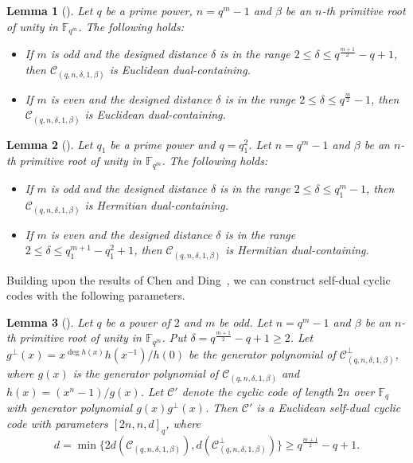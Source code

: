 \documentclass[journal,12pt,onecolumn]{IEEEtran}
\newtheorem{lemma}{Lemma}
\begin{document}
\begin{lemma}[\cite{4106108}]
    \label{Euclidean dual-containing}
    Let $q$ be a prime power, $n=q^m-1$ and $\beta$ be an $n$-th primitive root of unity in $\mathbb{F}_{q^m}$. The following holds:
    \begin{itemize}
        \item If $m$ is odd and the designed distance $\delta$ is in the range $2\le \delta\le q^{\frac{m+1}{2}}-q+1$, then $\mathcal{C}_{(q,n,\delta,1,\beta)}$ is Euclidean dual-containing.
        \item If $m$ is even and the designed distance $\delta$ is in the range $2\le \delta\le q^{\frac{m}{2}}-1$, then $\mathcal{C}_{(q,n,\delta,1,\beta)}$ is Euclidean dual-containing.
    \end{itemize}
\end{lemma}

\begin{lemma}[\cite{4106108}]
    \label{Hermitian dual-containing}
    Let $q_1$ be a prime power and $q=q_1^2$. Let $n=q^m-1$ and $\beta$ be an $n$-th primitive root of unity in $\mathbb{F}_{q^m}$. The following holds:
    \begin{itemize}
        \item If $m$ is odd and the designed distance $\delta$ is in the range $2\le \delta\le q_1^m-1$, then $\mathcal{C}_{(q,n,\delta,1,\beta)}$ is Hermitian dual-containing.
        \item If $m$ is even and the designed distance $\delta$ is in the range $2\le \delta\le q_1^{m+1}-q_1^2+1$, then $\mathcal{C}_{(q,n,\delta,1,\beta)}$ is Hermitian dual-containing.
    \end{itemize}
    
\end{lemma}

Building upon the results of Chen and Ding~\cite{10856234}, we can construct self-dual cyclic codes with the following parameters.

\begin{lemma}[\cite{10856234}]
\label{odd Euclidean self-dual}
    Let $q$ be a power of $2$ and $m$ be odd. Let $n=q^m-1$ and $\beta$ be an $n$-th primitive root of unity in $\mathbb{F}_{q^m}$. Put $\delta=q^{\frac{m+1}{2}}-q+1\ge2$. Let $g^\perp(x)=x^{\deg h(x)}h(x^{-1})/h(0)$ be the generator polynomial of $\mathcal{C}_{(q,n,\delta,1,\beta)}^\perp$, where $g(x)$ is the generator polynomial of $\mathcal{C}_{(q,n,\delta,1,\beta)}$ and $h(x)=(x^n-1)/g(x)$. Let $\mathcal{C}'$ denote the cyclic code of length $2n$ over $\mathbb{F}_q$ with generator polynomial $g(x)g^\perp(x)$. Then $\mathcal{C}'$ is a Euclidean self-dual cyclic code with parameters $[2n,n,d]_q$, where \[d=\min\{2d(\mathcal{C}_{(q,n,\delta,1,\beta)}),d(\mathcal{C}_{(q,n,\delta,1,\beta)}^\perp)\}\ge q^{\frac{m+1}{2}}-q+1.\]
\end{lemma}
\end{document}
